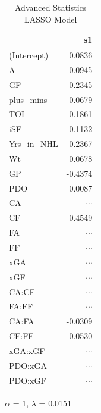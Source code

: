 \documentclass[10pt]{article}
\begin{document}
{{{{\begin{table}[tph]
\caption{\label{tab:advanced-LASSO}Advanced Statistics LASSO Model}
\centering
\begin{threeparttable}
   \begin{tabular}[t]{lr}
      \toprule
     & s1 \\
      \midrule
    (Intercept) & 0.0836 \\
    A & 0.0945 \\
    GF & 0.2345 \\
    plus\_mins & -0.0679 \\
    TOI & 0.1861 \\
    iSF & 0.1132 \\
    Yrs\_in\_NHL & 0.2367 \\
    Wt & 0.0678 \\
    GP & -0.4374 \\
    PDO & 0.0087 \\
    CA & $\cdots$ \\
    CF & 0.4549 \\
    FA & $\cdots$ \\
    FF & $\cdots$ \\
    xGA & $\cdots$ \\
    xGF & $\cdots$ \\
    CA:CF & $\cdots$ \\
    FA:FF & $\cdots$ \\
    CA:FA & -0.0309 \\
    CF:FF & -0.0530 \\
    xGA:xGF & $\cdots$ \\
    PDO:xGA & $\cdots$ \\
    PDO:xGF  & $\cdots$ \\
    \bottomrule
    \end{tabular}
    \begin{tablenotes}
      \item  $\alpha$ = 1, $\lambda$ = 0.0151
    \end{tablenotes}
  \end{threeparttable}    
\end{table}

}}}}
\end{document}
